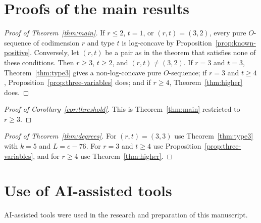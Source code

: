 \documentclass{amsart}
\theoremstyle{definition}
\theoremstyle{remark}
\begin{document}
\section{Proofs of the main results}\label{sec:proofs}

\begin{proof}[Proof of Theorem~\ref{thm:main}]
If $r\le 2$, $t=1$, or $(r,t)=(3,2)$, every pure $O$-sequence of codimension $r$ and type $t$ is log-concave by Proposition~\ref{prop:known-positive}. Conversely, let $(r,t)$ be a pair as in the theorem that satisfies none of these conditions. Then $r\ge 3$, $t\ge 2$, and $(r,t)\ne(3,2)$. If $r=3$ and $t=3$, Theorem~\ref{thm:type3} gives a non-log-concave pure $O$-sequence; if $r=3$ and $t\ge 4$, Proposition~\ref{prop:three-variables} does; and if $r\ge 4$, Theorem~\ref{thm:higher} does.
\end{proof}

\begin{proof}[Proof of Corollary~\ref{cor:threshold}]
This is Theorem~\ref{thm:main} restricted to $r\ge 3$.
\end{proof}

\begin{proof}[Proof of Theorem~\ref{thm:degrees}]
For $(r,t)=(3,3)$ use Theorem~\ref{thm:type3} with $k=5$ and $L=e-76$. For $r=3$ and $t\ge 4$ use Proposition~\ref{prop:three-variables}, and for $r\ge 4$ use Theorem~\ref{thm:higher}.
\end{proof}

\section*{Use of AI-assisted tools}
AI-assisted tools were used in the research and preparation of this manuscript.
\end{document}
